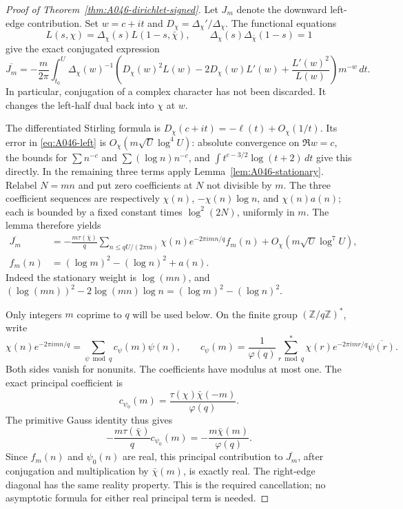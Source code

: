 \begin{proof}[Proof of Theorem~\ref{thm:A046-dirichlet-signed}]
Let \(J_m\) denote the downward left-edge contribution.
Set \(w=c+it\) and \(D_\chi=\Delta_\chi'/\Delta_\chi\).
The functional equations
\[
 L(s,\chi)=\Delta_\chi(s)L(1-s,\bar\chi),\qquad
       \Delta_\chi(s)\Delta_{\bar\chi}(1-s)=1
\]
give the exact conjugated expression
\begin{equation}\label{eq:A046-left}
 \overline{J_m}
   =-\frac m{2\pi}\int_{t_0}^{U}\Delta_\chi(w)^{-1}
       \left(D_\chi(w)^2L(w)-2D_\chi(w)L'(w)
                         +\frac{L'(w)^2}{L(w)}\right)m^{-w}\,dt.
\end{equation}
In particular, conjugation of a complex character has not
been discarded. It changes the left-half dual back into
\(\chi\) at \(w\).

The differentiated Stirling formula is
\(D_\chi(c+it)=-\ell(t)+O_\chi(1/t)\).
Its error in \eqref{eq:A046-left} is
\(O_\chi(m\sqrt U\log^4U)\): absolute convergence on
\(\Re w=c\), the bounds for
\(\sum n^{-c}\) and \(\sum(\log n)n^{-c}\), and
\(\int t^{c-3/2}\log(t+2)\,dt\) give this directly.
In the remaining three terms apply
Lemma~\ref{lem:A046-stationary}. Relabel \(N=mn\) and
put zero coefficients at \(N\) not divisible by \(m\).
The three coefficient sequences are respectively
\(\chi(n)\), \(-\chi(n)\log n\), and \(\chi(n)a(n)\);
each is bounded by a fixed constant times \(\log^2(2N)\),
uniformly in \(m\). The lemma therefore yields
\begin{align}\label{eq:A046-left-main}
 \overline{J_m}
 &=-\frac{m\tau(\bar\chi)}q
      \sum_{n\le qU/(2\pi m)}\chi(n)e^{-2\pi imn/q}
               f_m(n)+O_\chi(m\sqrt U\log^7U),\\
 f_m(n)&=(\log m)^2-(\log n)^2+a(n).\nonumber
\end{align}
Indeed the stationary weight is \(\log(mn)\), and
\((\log(mn))^2-2\log(mn)\log n
   =(\log m)^2-(\log n)^2\).

Only integers \(m\) coprime to \(q\) will be used below.
On the finite group \((\mathbb Z/q\mathbb Z)^*\), write
\[
 \chi(n)e^{-2\pi imn/q}
                  =\sum_{\psi\bmod q}c_\psi(m)\psi(n),
 \qquad
 c_\psi(m)=\frac1{\varphi(q)}
       \sum_{r\bmod q}^{*}
          \chi(r)e^{-2\pi imr/q}\overline{\psi(r)}.
\]
Both sides vanish for nonunits. The coefficients have modulus
at most one. The exact principal coefficient is
\[
       c_{\psi_0}(m)=\frac{\tau(\chi)\bar\chi(-m)}{\varphi(q)}.
\]
The primitive Gauss identity thus gives
\[
 -\frac{m\tau(\bar\chi)}q c_{\psi_0}(m)
                            =-\frac{m\bar\chi(m)}{\varphi(q)}.
\]
Since \(f_m(n)\) and \(\psi_0(n)\) are real, this principal
contribution to \(\overline{J_m}\), after conjugation and
multiplication by \(\bar\chi(m)\), is exactly real.
The right-edge diagonal has the same reality property.
This is the required cancellation; no asymptotic formula
for either real principal term is needed.


\end{proof}
